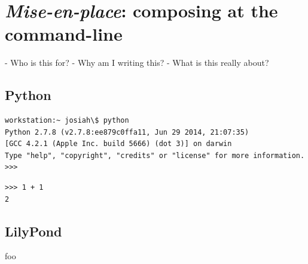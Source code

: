 \section{\emph{Mise-en-place}: composing at the command-line}

\begin{markdown}
-   Who is this for?
-   Why am I writing this?
-   What is this really about?
\end{markdown}

\subsection{Python}

\begin{singlespacing}
\vspace{-0.5\baselineskip}
\begin{lstlisting}
workstation:~ josiah\$ python
Python 2.7.8 (v2.7.8:ee879c0ffa11, Jun 29 2014, 21:07:35)
[GCC 4.2.1 (Apple Inc. build 5666) (dot 3)] on darwin
Type "help", "copyright", "credits" or "license" for more information.
>>>
\end{lstlisting}
\end{singlespacing}

\begin{singlespacing}
\vspace{-0.5\baselineskip}
\begin{lstlisting}
>>> 1 + 1
2
\end{lstlisting}
\end{singlespacing}

\subsection{LilyPond}

foo

